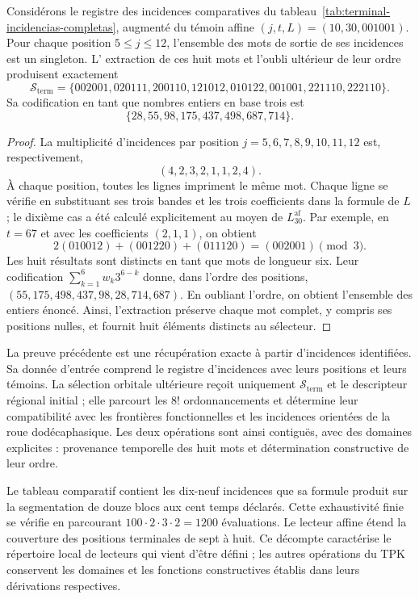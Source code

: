 \begin{proposition}
\label{prop:repertorio-terminal-ocho-incidencias}
Considérons le registre des incidences comparatives du
tableau~\ref{tab:terminal-incidencias-completas}, augmenté du témoin
affine $(j,t,L)=(10,30,001001)$. Pour chaque position $5\leq j\leq12$,
l'ensemble des mots de sortie de ses incidences est un singleton. L'
extraction de ces huit mots et l'oubli ultérieur de leur ordre
produisent exactement
\[
 \mathcal S_{\mathrm{term}}=
 \{002001,020111,200110,121012,010122,001001,221110,222110\}.
\]
Sa codification en tant que nombres entiers en base trois est
\[
 \{28,55,98,175,437,498,687,714\}.
\]
\end{proposition}
\begin{proof}
La multiplicité d'incidences par position $j=5,6,7,8,9,10,11,12$
est, respectivement,
\[
 (4,2,3,2,1,1,2,4).
\]
À chaque position, toutes les lignes impriment le même mot. Chaque ligne se vérifie en substituant ses trois bandes et les trois coefficients dans la formule de $L$ ; le dixième cas a été calculé explicitement au moyen de $L^{\mathrm{af}}_{30}$. Par exemple, en $t=67$ et avec les coefficients $(2,1,1)$, on obtient
\[
 2(010012)+(001220)+(011120)=(002001)\pmod3.
\]
Les huit résultats sont distincts en tant que mots de longueur six. Leur codification $\sum_{k=1}^{6}w_k3^{6-k}$ donne, dans l'ordre des positions, $(55,175,498,437,98,28,714,687)$. En oubliant l'ordre, on obtient l'ensemble des entiers énoncé. Ainsi, l'extraction préserve chaque mot complet, y compris ses positions nulles, et fournit huit éléments distincts au sélecteur.
\end{proof}

La preuve précédente est une récupération exacte à partir d'incidences
identifiées. Sa donnée d'entrée comprend le registre d'incidences
avec leurs positions et leurs témoins. La sélection orbitale ultérieure reçoit
uniquement $\mathcal S_{\mathrm{term}}$ et le descripteur régional initial ;
elle parcourt les $8!$ ordonnancements et détermine leur compatibilité avec les
frontières fonctionnelles et les incidences orientées de la roue
dodécaphasique. Les deux opérations sont ainsi contiguës, avec des domaines
explicites : provenance temporelle des huit mots et détermination
constructive de leur ordre.

Le tableau comparatif contient les dix-neuf incidences que sa formule produit sur la segmentation de douze blocs aux cent temps déclarés. Cette exhaustivité finie se vérifie en parcourant $100\cdot2\cdot3\cdot2=1200$ évaluations. Le lecteur affine étend la couverture des positions terminales de sept à huit. Ce décompte caractérise le répertoire local de lecteurs qui vient d'être défini ; les autres opérations du TPK conservent les domaines et les fonctions constructives établis dans leurs dérivations respectives.

